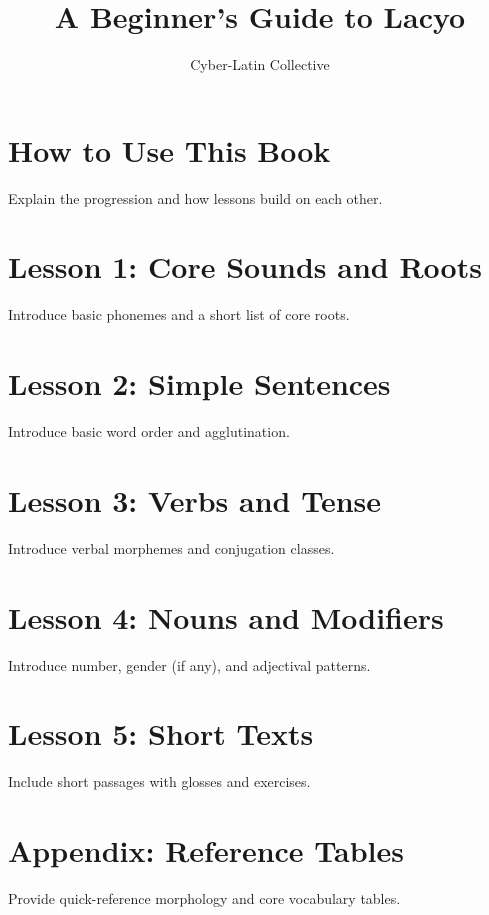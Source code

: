 \documentclass[12pt]{book}
\title{A Beginner's Guide to Lacyo}
\author{Cyber-Latin Collective}
\date{}
\begin{document}
\maketitle
\tableofcontents

\chapter{How to Use This Book}
Explain the progression and how lessons build on each other.

\chapter{Lesson 1: Core Sounds and Roots}
Introduce basic phonemes and a short list of core roots.

\chapter{Lesson 2: Simple Sentences}
Introduce basic word order and agglutination.

\chapter{Lesson 3: Verbs and Tense}
Introduce verbal morphemes and conjugation classes.

\chapter{Lesson 4: Nouns and Modifiers}
Introduce number, gender (if any), and adjectival patterns.

\chapter{Lesson 5: Short Texts}
Include short passages with glosses and exercises.

\chapter{Appendix: Reference Tables}
Provide quick-reference morphology and core vocabulary tables.
\end{document}
